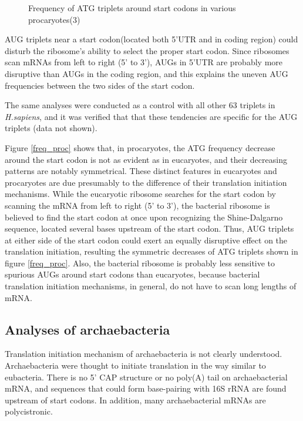 \begin{figure}
\begin{center}
\end{center}
\caption{Frequency of ATG triplets around start codons in various
procaryotes(3)} 
\label{freq_proc3}
\end{figure}


AUG triplets near a start codon(located both 5'UTR and in coding
region) could disturb the ribosome's ability to select the proper
start codon. Since ribosomes scan mRNAs from left to right (5' to 3'),
AUGs in 5'UTR are probably more disruptive than AUGs in the coding
region, and this explains the uneven AUG frequencies between the two
sides of the start codon.

The same analyses were conducted as a control with all other 63
triplets in {\it H.sapiens}, and it was verified that that these
tendencies are specific for the AUG triplets (data not shown).

Figure \ref{freq_proc} shows that, in procaryotes,
the ATG frequency decrease around the start codon is not as evident as
in eucaryotes, and their decreasing patterns are notably symmetrical.
These distinct features in eucaryotes and procaryotes are due
presumably to the difference of their translation initiation
mechanisms.  While the eucaryotic ribosome searches for the start
codon by scanning the mRNA from left to right (5' to 3'), the
bacterial ribosome is believed to find the start codon at once upon
recognizing the Shine-Dalgarno sequence, located several bases
upstream of the start codon.  Thus, AUG triplets at either side of
the start codon could exert an equally disruptive effect on the
translation initiation, resulting the symmetric decreases of ATG
triplets shown in figure \ref{freq_proc}.  Also,
the bacterial ribosome is probably less sensitive to spurious AUGs
around start codons than eucaryotes, because bacterial translation
initiation mechanisms, in general, do not have to scan long lengths of
mRNA.


\subsection{Analyses of  archaebacteria}
\label{trans_arc}

Translation initiation mechanism of archaebacteria is not
clearly understood.  Archaebacteria were thought to initiate
translation in the way similar to eubacteria. There is no 5' CAP
structure or no poly(A) tail on archaebacterial mRNA, and sequences
that could form base-pairing with 16S rRNA are found upstream of start
codons\cite{label2051,label2014,label2025}. 
In addition, many archaebacterial mRNAs are polycistronic.  

